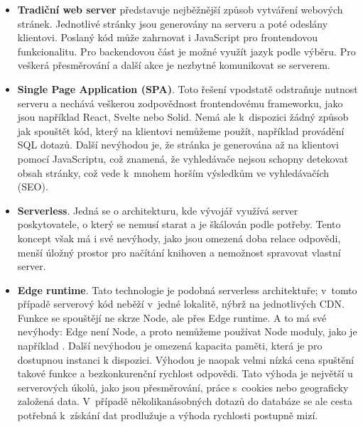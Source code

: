 \documentclass[12pt, a4paper,
openright
]{report}
\begin{document}
\begin{itemize}
\item \textbf{Tradiční web server} představuje nejběžnější způsob vytváření webových stránek. Jednotlivé stránky jsou generovány na serveru a poté odeslány klientovi. Poslaný kód může zahrnovat i JavaScript pro frontendovou funkcionalitu. Pro backendovou část je možné využít jazyk podle výběru. Pro veškerá přesměrování a další akce je nezbytné komunikovat se serverem. \cite{SPA}

\item \textbf{Single Page Application (SPA)}. Toto řešení vpodstatě odstraňuje nutnost serveru a nechává veškerou zodpovědnost frontendovému frameworku, jako jsou například React, Svelte nebo Solid. Nemá ale k~dispozici žádný způsob jak spouštět kód, který na klientovi nemůžeme použít, například provádění SQL dotazů. Další nevýhodou je, že stránka je generována až na klientovi pomocí JavaScriptu, což znamená, že vyhledávače nejsou schopny detekovat obsah stránky, což vede k~mnohem horším výsledkům ve vyhledávačích (SEO). \cite{SPA}

\item \textbf{Serverless}. Jedná se o architekturu, kde vývojář využívá server poskytovatele, o který se nemusí starat a je škálován podle potřeby. Tento koncept však má i své nevýhody, jako jsou omezená doba relace odpovědi, menší úložný prostor pro načítání knihoven a nemožnost spravovat vlastní server. \cite{Serverless}

\item \textbf{Edge runtime}. Tato technologie je podobná serverless architektuře; v~tomto případě serverový kód neběží v~jedné lokalitě, nýbrž na jednotlivých CDN. Funkce se spouštějí ne skrze Node, ale přes Edge runtime. A to má své nevýhody: Edge není Node, a proto nemůžeme používat Node moduly, jako je například . Další nevýhodou je omezená kapacita paměti, která je pro dostupnou instanci k dispozici. Výhodou je naopak velmi nízká cena spuštění takové funkce a bezkonkurenční rychlost odpovědi. Tato výhoda je největší u serverových úkolů, jako jsou přesměrování, práce s~cookies nebo geograficky založená data. V~případě několikanásobných dotazů do databáze se ale cesta potřebná k~získání dat prodlužuje a výhoda rychlosti postupně mizí. \cite{Serverless}


\end{itemize}
\end{document}
